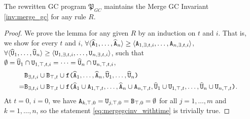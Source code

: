 \begin{lemma}
\label{lem:merge_gc_inv}
The rewritten GC program $\mathfrak{P}_{GC}$ maintains the Merge GC Invariant \ref{inv:merge_gc} for any rule $R$.
\end{lemma}
\begin{proof}
We prove the lemma for any given $R$ by an induction on $t$ and $i$.
That is, we show for every $t$ and $i$,
$\forall \langle \widehat{\tt{A}}_1, \dots, \widehat{\tt{A}}_n\rangle \geq \langle \tt{A}_{1,\exists,t,i},\dots,\tt{A}_{n,\exists,t,i} \rangle$,
$\forall \langle \widehat{\tt{U}}_1, \dots, \widehat{\tt{U}}_n\rangle \geq \langle \tt{U}_{1,\exists,t,i},\dots,\tt{U}_{n,\exists,t,i} \rangle$,
such that
$\emptyset = \widehat{\tt{U}}_1 \cap \tt{U}_{1,\top,t,i} = \dots =  \widehat{\tt{U}}_n \cap \tt{U}_{n,\top,t,i}$,
\begin{align}
&
\tt{B}_{\exists,t,i} \cup \tt{B}_{\top,t}
\cup
\tt{f(}
  \widehat{\tt{A}}_1,
    \dots,
    \widehat{\tt{A}}_n,
  \widehat{\tt{U}}_1,
    \dots,
    \widehat{\tt{U}}_n
\tt{)}
\nonumber\\
=&
\tt{B}_{\exists,t,i} \cup \tt{B}_{\top,t}
\cup
\tt{f(}
  \widehat{\tt{A}}_1 \cup \tt{A}_{1,\top,t},
  \dots,
  \widehat{\tt{A}}_n \cup \tt{A}_{n,\top,t},
  \widehat{\tt{U}}_1 \cup \tt{U}_{1,\top,t},
  \dots,
  \widehat{\tt{U}}_n \cup \tt{U}_{n,\top,t}
\tt{)}. \label{eq:mergegcinv_withtime}
\end{align}
At $t=0$, $i=0$, we have $\tt{A}_{k,\top,0} = \tt{U}_{j,\top,0} = \tt{B}_{\top,0} = \emptyset$ for all $j=1,\dots,m$ and $k=1,\dots,n$, so the statement \eqref{eq:mergegcinv_withtime} is trivially true.


\end{proof}
